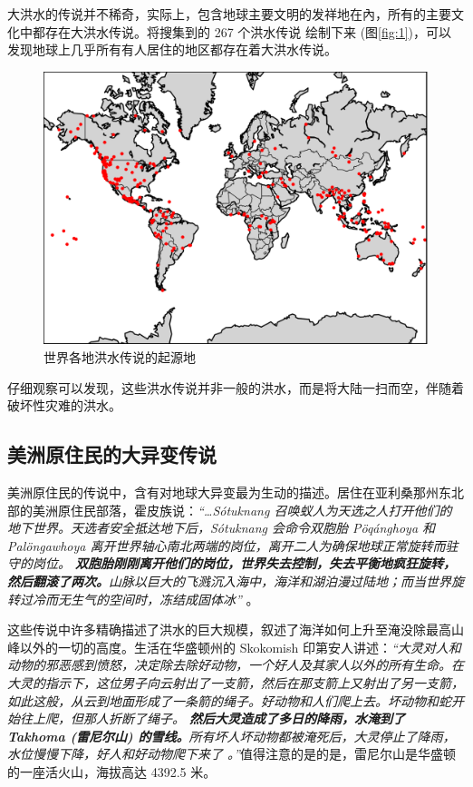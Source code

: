 \documentclass[10pt,twocolumn,letterpaper]{article}
\begin{document}
大洪水的传说并不稀奇，实际上，包含地球主要文明的发祥地在內，所有的主要文化中都存在大洪水传说。将搜集到的 267 个洪水传说 \cite{3} 绘制下来 (图\ref{fig:1})，可以发现地球上几乎所有有人居住的地区都存在着大洪水传说。

\begin{figure}[h]
\begin{center}
   \includegraphics[width=1\linewidth]{b.png}
\end{center}
   \caption{世界各地洪水传说的起源地 \cite{3}}
\label{fig:1}
\label{fig:onecol}
\end{figure}

仔细观察可以发现，这些洪水传说并非一般的洪水，而是将大陆一扫而空，伴随着破坏性灾难的洪水。

\subsection{美洲原住民的大异变传说}

美洲原住民的传说中，含有对地球大异变最为生动的描述。居住在亚利桑那州东北部的美洲原住民部落，霍皮族说：\textit{“…Sótuknang 召唤蚁人为天选之人打开他们的地下世界。天选者安全抵达地下后，Sótuknang 会命令双胞胎 Pöqánghoya 和 Palöngawhoya 离开世界轴心南北两端的岗位，离开二人为确保地球正常旋转而驻守的岗位。 \textbf{双胞胎刚刚离开他们的岗位，世界失去控制，失去平衡地疯狂旋转，然后翻滚了两次。}山脉以巨大的飞溅沉入海中，海洋和湖泊漫过陆地；而当世界旋转过冷而无生气的空间时，冻结成固体冰”} \cite{4}。

这些传说中许多精确描述了洪水的巨大规模，叙述了海洋如何上升至淹没除最高山峰以外的一切的高度。生活在华盛顿州的 Skokomish 印第安人讲述：\textit{“大灵对人和动物的邪恶感到愤怒，决定除去除好动物，一个好人及其家人以外的所有生命。在大灵的指示下，这位男子向云射出了一支箭，然后在那支箭上又射出了另一支箭，如此这般，从云到地面形成了一条箭的绳子。好动物和人们爬上去。坏动物和蛇开始往上爬，但那人折断了绳子。 \textbf{然后大灵造成了多日的降雨，水淹到了 Takhoma (雷尼尔山) 的雪线。}所有坏人坏动物都被淹死后，大灵停止了降雨，水位慢慢下降，好人和好动物爬下来了 \cite{3}。”}值得注意的是的是，雷尼尔山是华盛顿的一座活火山，海拔高达 4392.5 米。
\end{document}
